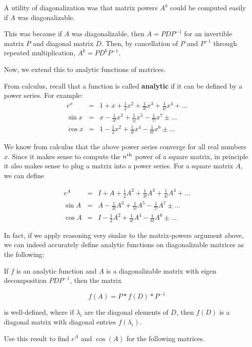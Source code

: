 \documentclass{ximera}
\author{Zack Reed}
\begin{document}
A utility of diagonalization was that matrix powers $A^k$ could be computed easily if $A$ was diagonalizable.

This was because if $A$ was diagonalizable, then $A=PDP^{-1}$ for an invertible matrix $P$ and diagonal matrix $D$. Then, by cancellation of $P$ and $P^{-1}$ through repeated multiplication, $A^k=PD^kP^{-1}$.

Now, we extend this to analytic functions of matrices. 

From calculus, recall that a function is called \textbf{analytic} if it can be defined by a power series. For example:
\begin{eqnarray*}
  e^{x} &=& 1 + x + \frac{1}{2}x^2 + \frac{1}{3!}x^3 + \frac{1}{4!}x^4 + \ldots \\
  \sin x &=& x - \frac{1}{3!}x^3 + \frac{1}{5!}x^5 - \frac{1}{7!}x^7 \pm \ldots \\
  \cos x &=& 1 - \frac{1}{2}x^2 + \frac{1}{4!}x^4 - \frac{1}{6!}x^6 \pm \ldots
\end{eqnarray*}

We know from calculus that the above power series converge for all
real numbers $x$. Since it makes sense to compute the $n^{\text{th}}$ power of
a square matrix, in principle it also makes sense to plug a matrix
into a power series. For a square matrix $A$, we can define

\begin{eqnarray*}
  e^{A} &=& I + A + \frac{1}{2}A^2 + \frac{1}{3!}A^3 + \frac{1}{4!}A^4 + \ldots \\
  \sin A &=& A - \frac{1}{3!}A^3 + \frac{1}{5!}A^5 - \frac{1}{7!}A^7 \pm \ldots \\
  \cos A &=& I - \frac{1}{2}A^2 + \frac{1}{4!}A^4 - \frac{1}{6!}A^6 \pm \ldots
\end{eqnarray*}

In fact, if we apply reasoning very simlar to the matrix-powers argument above, we can indeed accurately define analytic functions on diagonalizable matrices as the following:

If $f$ is an analytic function and $A$ is a diagonalizable matrix with eigen decomposition $PDP^{-1}$, then the matrix 

$$f(A)=P*f(D)*P^{-1}$$

is well-defined, where if $\lambda_i$ are the diagonal elements of $D$, then $f(D)$ is a diagonal matrix with diagonal entries $f(\lambda_i)$.

Use this result to find $e^A$ and $\cos(A)$ for the following matrices. 
\end{document}
